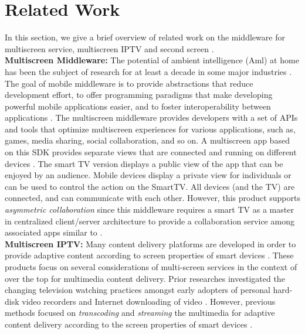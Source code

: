 \documentclass[conference]{IEEEtran}
\begin{document}
\section{Related Work}
\label{sc:RelatedWork}
In this section, we give a brief overview of related work on the middleware for multiscreen service, multiscreen IPTV and second screen \cite{MKrug2014, ehsan2013, Honda:2008, Lanese:2007, Lapadula:2007, Vieira:2008, Yoshida:2007}.\\ 

\noindent
\textbf{Multiscreen Middleware:}
The potential of ambient intelligence (Aml) at home has been the subject of research for at least a decade in some major industries \cite{Aarts:2004} .%
The goal of mobile middleware is to provide abstractions that reduce development effort, to offer programming paradigms that make developing powerful mobile applications easier, and to foster interoperability between applications \cite{DBLP:FuentesPCM06}.
The multiscreen middleware provides developers with a set of APIs and tools that optimize multiscreen experiences for various applications, such as, games, media sharing, social collaboration, and so on.
A multiscreen app based on this SDK provides separate views that are connected and running on different devices \cite{samsung:2014}. 
The smart TV version displays a public view of the app that can be enjoyed by an audience. 
Mobile devices display a private view for individuals or can be used to control the action on the SmartTV. 
All devices (and the TV) are connected, and can communicate with each other.
However, this product supports  \textit{asymmetric collaboration} since this middleware requires a smart TV as a master in centralized client/server architecture to provide a collaboration service among associated apps similar to \cite{Ma:2008}.\\

\noindent
\textbf{Multiscreen IPTV:}  
Many content delivery platforms are developed in order to provide adaptive content according to screen properties of smart devices \cite{Anstead:2014} .
These products focus on several considerations of multi-screen services in the context of over the top for multimedia content delivery. 
Prior researches investigated the changing television watching practices amongst early adopters of personal hard-disk video recorders and Internet downloading of video \cite{Barkhuus:2009}.
However, previous methods focused on \textit{transcoding} and \textit{streaming} the multimedia for adaptive content delivery according to the screen properties of smart devices \cite{Motti:2013}.\\ 
\end{document}

